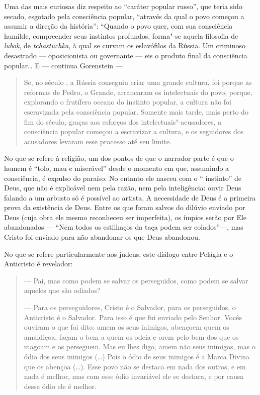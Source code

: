 Uma das mais curiosas diz respeito ao ``caráter popular russo'', que
teria sido secado, esgotado pela consciência popular, ``através da qual
o povo começou a assumir a direção da história'': ``Quando o povo quer,
com sua consciência humilde, compreender seus instintos profundos,
forma"-se aquela filosofia de \emph{lubok}, de \emph{tchastuchka}, à qual
se curvam os eslavófilos da Rússia. Um criminoso desastrado ---
oposicionista ou governante --- eis o produto final da consciência
popular\ldots{} E --- continua Gorenstein ---

\begin{quote}
Se, no século , a Rússia conseguiu criar uma grande
cultura, foi porque as reformas de Pedro, o Grande, arrancaram os
intelectuais do povo, porque, explorando o frutífero oceano do instinto
popular, a cultura não foi escravizada pela consciência popular. Somente
mais tarde, mais perto do fim do século, graças aos esforços dos
intelectuais"-acusadores, a consciência popular começou a escravizar a
cultura, e os seguidores dos acusadores levaram esse processo até seu
limite.
\end{quote}

No que se refere à religião, um dos pontos de que o narrador parte é que
o homem é ``tolo, mau e miserável'' desde o momento em que, assumindo a
consciência, é expulso do paraíso. No entanto ele nasceu com o ``
instinto'' de Deus, que não é explicável nem pela razão, nem pela
inteligência: ouvir Deus falando a um arbusto só é possível ao artista.
A necessidade de Deus é a primeira prova da existência de Deus. Entre os
que foram salvos do dilúvio enviado por Deus (cuja obra ele mesmo
reconheceu ser imperfeita), os ímpios serão por Ele abandonados ---
``Nem todos os estilhaços da taça podem ser colados''---, mas Cristo
foi enviado para não abandonar os que Deus abandonou.

No que se refere particularmente aos judeus, este diálogo entre Pelágia
e o Anticristo é revelador:

\begin{quote}
--- Pai, mas como podem se salvar os perseguidos, como podem se salvar
aqueles que são odiados?

\noindent{}--- Para os perseguidores, Cristo é o Salvador, para os perseguidos, o
Anticristo é o Salvador. Para isso é que fui enviado pelo Senhor. Vocês
ouviram o que foi dito: amem os seus inimigos, abençoem quem os
amaldiçoa, façam o bem a quem os odeia e orem pelo bem dos que os magoam
e os perseguem. Mas eu lhes digo, amem não seus inimigos, mas o ódio dos
seus inimigos (\ldots{}) Pois o ódio de seus inimigos é a Marca Divina que os
abençoa (\ldots{}). Esse povo não se destaca em nada dos outros, e em nada é
melhor, mas com esse ódio invariável ele se destaca, e por causa desse
ódio ele é melhor.
\end{quote}

